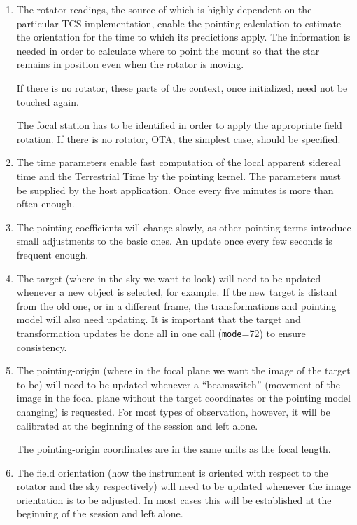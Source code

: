 \documentclass[12pt,fleqn,twoside]{article}
\renewcommand{\_}{{\tt\char'137}}     %
\begin{document}
{\begin{enumerate}
      The {\tt tai} argument is accessed only if {\tt mode}=0.
\item The rotator readings, the source of which is highly dependent
      on the particular TCS implementation, enable the pointing
      calculation to estimate  the orientation for the time to which
      its predictions apply.  The information is needed in order
      to calculate where to point the mount so that the star remains
      in position even when the rotator is moving.

      If there is no rotator, these parts of the context, once
      initialized, need not be touched again.

      The focal station has to be identified in order to apply the
      appropriate field rotation.  If there is no rotator, OTA, the
      simplest case, should be specified.
\item The time parameters enable fast computation of the local apparent
      sidereal time and the Terrestrial Time by the pointing kernel.
      The parameters must be supplied by the host application.  Once
      every five minutes is more than often enough.
\item The pointing coefficients will change slowly, as other pointing
      terms introduce small adjustments to the basic ones.  An update
      once every few seconds is frequent enough.
\item The target (where in the sky we want to look) will need to be
      updated whenever a new object is selected, for example.  If the
      new target is distant from the old one, or in a different frame,
      the transformations and pointing model will also need updating.
      It is important that the target and transformation updates be
      done all in one call ({\tt mode}=72) to ensure consistency.
\item The pointing-origin (where in the focal plane we want the image
      of the target to be) will need to be updated whenever a
      ``beamswitch'' (movement of the image in the focal plane without
      the target coordinates or the pointing model changing) is
      requested.  For most types of observation, however, it will be
      calibrated at the beginning of the session and left alone.

      The pointing-origin coordinates are in the same units as the
      focal length.
\item The field orientation (how the instrument is oriented with
      respect to the rotator and the sky respectively) will need to be
      updated whenever the image orientation is to be adjusted.  In
      most cases this will be established at the beginning of the
      session and left alone.


\end{enumerate}}
\end{document}
